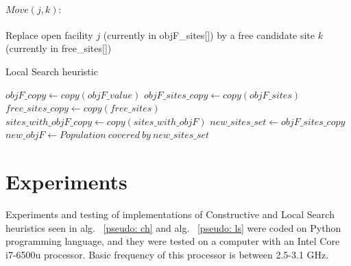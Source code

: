 \documentclass[11pt, a4paper]{article}
\begin{document}
\paragraph{$Move(j,k):$}
Replace open facility $j$ (currently in objF\_sites[]) by a free candidate site $k$ (currently in free\_sites[]) 

\begin{algorithm}
	\caption{Local Search heuristic}\label{pseudo: ls}
	\SetAlgoLined
	\DontPrintSemicolon

	\KwResult{}
	$objF\_copy \gets copy(objF\_value)$\;
	$objF\_sites\_copy \gets copy(objF\_sites)$\;
	$free\_sites\_copy \gets copy(free\_sites)$\;
	$sites\_with\_objF\_copy \gets copy(sites\_with\_objF)$\;
	\BlankLine
	\BlankLine
	\BlankLine
	\BlankLine
	$new\_sites\_set \gets objF\_sites\_copy$\;
	$new\_objF \gets Population \ covered \ by \ new\_sites\_set$\;
	\BlankLine
\end{algorithm}

\newpage
\section{Experiments}
Experiments and testing of implementations of Constructive and Local Search heuristics seen in alg. ~\ref{pseudo: ch} and alg. ~\ref{pseudo: ls} were coded on Python programming language, and they were tested on a computer with an Intel Core i7-6500u processor. Basic frequency of this processor is between 2.5-3.1 GHz.
\end{document}
